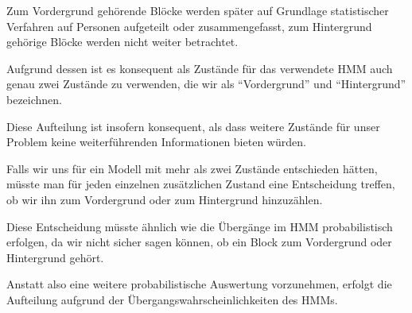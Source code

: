 Zum Vordergrund gehörende Blöcke werden später auf Grundlage statistischer Verfahren auf Personen aufgeteilt oder zusammengefasst, zum Hintergrund gehörige Blöcke werden nicht weiter betrachtet.

Aufgrund dessen ist es konsequent als Zustände für das verwendete HMM auch genau zwei Zustände zu verwenden, die wir als “Vordergrund” und “Hintergrund” bezeichnen.

Diese Aufteilung ist insofern konsequent, als dass weitere Zustände für unser Problem keine weiterführenden Informationen bieten würden.

Falls wir uns für ein Modell mit mehr als zwei Zustände entschieden hätten, müsste man für jeden einzelnen zusätzlichen Zustand eine Entscheidung treffen, ob wir ihn zum Vordergrund oder zum Hintergrund hinzuzählen.

Diese Entscheidung müsste ähnlich wie die Übergänge im HMM probabilistisch erfolgen, da wir nicht sicher sagen können, ob ein Block zum Vordergrund oder Hintergrund gehört.

Anstatt also eine weitere probabilistische Auswertung vorzunehmen, erfolgt die Aufteilung aufgrund der Übergangswahrscheinlichkeiten des HMMs.


